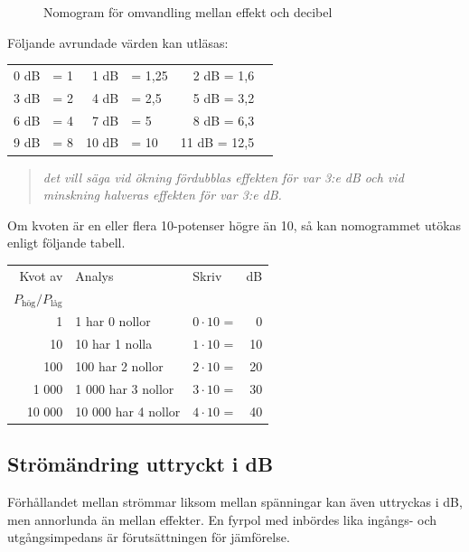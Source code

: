 \begin{figure}
  \caption{Nomogram för omvandling mellan effekt och decibel}
  \label{ellära-nomogram-db-effekt}
\end{figure}

Följande avrundade värden kan utläsas:

\begin{tabular}{rlrlrl}
0 dB & = 1 &  1 dB & =  1,25 & 2 dB = 1,6 \\
3 dB & = 2 &  4 dB & =  2,5  & 5 dB = 3,2 \\
6 dB & = 4 &  7 dB & =  5    & 8 dB = 6,3 \\
9 dB & = 8 & 10 dB & = 10    & 11 dB = 12,5
\end{tabular}

\begin{quote}\emph{
det vill säga vid ökning fördubblas effekten för var 3:e dB och vid minskning
halveras effekten för var 3:e dB.
}\end{quote}

Om kvoten är en eller flera 10-potenser högre än 10, så kan nomogrammet utökas
enligt följande tabell.

\begin{tabular}{rllr}
Kvot av & Analys             & Skriv            & dB \\
\(P_\text{hög}/P_\text{låg}\) &          &                  &    \\
     1 & 1 har 0 nollor      & \(0 \cdot 10\) = &  0 \\
    10 & 10 har 1 nolla      & \(1 \cdot 10\) = & 10 \\
   100 & 100 har 2 nollor    & \(2 \cdot 10\) = & 20 \\
 1 000 &  1 000 har 3 nollor & \(3 \cdot 10\) = & 30 \\
10 000 & 10 000 har 4 nollor & \(4 \cdot 10\) = & 40
\end{tabular}

\subsection{Strömändring uttryckt i dB}

Förhållandet mellan strömmar liksom mellan spänningar kan även uttryckas i dB,
men annorlunda än mellan effekter.
En fyrpol med inbördes lika ingångs- och utgångsimpedans är förutsättningen för
jämförelse.

